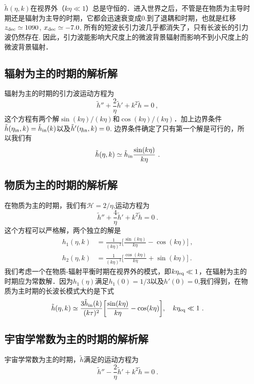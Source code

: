 $\tilde h(\eta,k)$在视界外（$k\eta\ll 1$）总是守恒的．进入世界之后，不管是在物质为主导时期还是辐射为主导的时期，它都会迅速衰变成0.到了退耦和时期，也就是红移$z_{\rm dec} \simeq 1090$, $x_{\rm dec}\simeq -7.0$, 所有的短波长引力波几乎都消失了，只有长波长的引力波仍然存在. 因此，引力波能影响大尺度上的微波背景辐射而影响不到小尺度上的微波背景辐射．

\subsection{辐射为主的时期的解析解}
辐射为主的时期的引力波运动方程为
\begin{equation}
\tilde h'' + \frac{2}{\eta} \tilde h' + k^2 \tilde h = 0~,
\end{equation}
这个方程有两个解$\sin(k\eta)/(k\eta)$和$\cos(k\eta)/(k\eta)$．加上边界条件$\tilde h(\eta_{\rm in},k) = \tilde h_{\rm in} (k)$以及$\tilde h'(\eta_{\rm in},k) = 0$. 边界条件确定了只有第一个解是可行的，所以我们有
\begin{equation}
\tilde h (\eta, k) \simeq \tilde h_{\rm in} \frac{\sin(k\eta)}{k\eta} ~.
\end{equation}

\subsection{物质为主的时期的解析解}
在物质为主的时期，我们有$\mathcal H = 2/\eta$,运动方程为
\begin{equation}
\tilde h'' + \frac{4}{\eta} \tilde h' + k^2 \tilde h = 0~.
\end{equation}
这个方程可以严格解，两个独立的解是
\begin{equation}
\begin{aligned}
h_1(\eta,k) & = \frac{1}{(k\eta)^2} \bigg[ \frac{\sin(k\eta)}{k\eta}  - \cos(k\eta) \bigg]~, \\
h_2(\eta,k) & = \frac{1}{(k\eta)^2} \bigg[ \frac{\cos(k\eta)}{k\eta} + \sin(k\eta) \bigg]~.
\end{aligned}
\end{equation}
我们考虑一个在物质-辐射平衡时期在视界外的模式，即$k\eta_{\rm eq}\ll 1$，在辐射为主的时期应为常数解．因为$h_1(\eta)$满足$h_1(0) = 1/3$以及$h'(0) = 0$,我们得到，在物质为主时期的长波长模式大约是下式
\begin{equation}
\tilde h (\eta,k) \simeq \frac{3\tilde h_{\rm in}(k)}{(k\tau)^2} \bigg[ \frac{\sin(k\eta)}{k\eta} - \cos(k\eta) \bigg], \quad k\eta_{\rm eq}\ll 1~.
\end{equation}


\subsection{宇宙学常数为主的时期的解析解}
宇宙学常数为主的时期，$\tilde h$满足的运动方程为
\begin{equation}
\tilde h'' - \frac{2}{\eta} \tilde h' + k^2 \tilde h = 0~.
\end{equation}


















